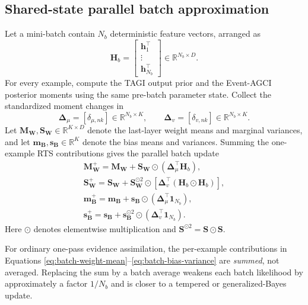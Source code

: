 \documentclass[11pt]{article}
\newcommand{\trans}{\intercal}
\begin{document}
\subsection{Shared-state parallel batch approximation}

Let a mini-batch contain $N_b$ deterministic feature vectors, arranged as
\begin{equation}
 \mathbf H_b
 =
 \begin{bmatrix}
 \bm h_1^\trans\\
 \vdots\\
 \bm h_{N_b}^\trans
 \end{bmatrix}
 \in\mathbb R^{N_b\times D}.
\end{equation}
For every example, compute the TAGI output prior and the Event-AGCI posterior
moments using the same pre-batch parameter state.  Collect the standardized
moment changes in
\begin{equation}
 \bm\Delta_\mu
 =
 [\delta_{\mu,nk}]
 \in\mathbb R^{N_b\times K},
 \qquad
 \bm\Delta_v
 =
 [\delta_{v,nk}]
 \in\mathbb R^{N_b\times K}.
\end{equation}
Let $\bm M_{\bm W},\bm S_{\bm W}\in\mathbb R^{K\times D}$ denote the
last-layer weight means and marginal variances, and let
$\bm m_{\bm B},\bm s_{\bm B}\in\mathbb R^K$ denote the bias means and
variances.  Summing the one-example RTS contributions gives the parallel batch
update
\begin{align}
 \boxed{
 \bm M_{\bm W}^{+}
 =
 \bm M_{\bm W}
 +
 \bm S_{\bm W}\odot
 \left(\bm\Delta_\mu^\trans\mathbf H_b\right),}
 \label{eq:batch-weight-mean}
 \\
 \boxed{
 \bm S_{\bm W}^{+}
 =
 \bm S_{\bm W}
 +
 \bm S_{\bm W}^{\odot 2}\odot
 \left[
 \bm\Delta_v^\trans
 (\mathbf H_b\odot\mathbf H_b)
 \right],}
 \label{eq:batch-weight-variance}
 \\
 \boxed{
 \bm m_{\bm B}^{+}
 =
 \bm m_{\bm B}
 +
 \bm s_{\bm B}\odot
 \left(\bm\Delta_\mu^\trans\bm 1_{N_b}\right),}
 \label{eq:batch-bias-mean}
 \\
 \boxed{
 \bm s_{\bm B}^{+}
 =
 \bm s_{\bm B}
 +
 \bm s_{\bm B}^{\odot 2}\odot
 \left(\bm\Delta_v^\trans\bm 1_{N_b}\right).}
 \label{eq:batch-bias-variance}
\end{align}
Here $\odot$ denotes elementwise multiplication and
$\bm S^{\odot 2}=\bm S\odot\bm S$.

For ordinary one-pass evidence assimilation, the per-example contributions in
Equations \eqref{eq:batch-weight-mean}--\eqref{eq:batch-bias-variance} are
\emph{summed}, not averaged.  Replacing the sum by a batch average weakens each
batch likelihood by approximately a factor $1/N_b$ and is closer to a tempered
or generalized-Bayes update.
\end{document}
